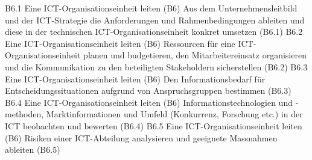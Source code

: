 \templateCard
  {B6.1}
  {Eine ICT-Organisationseinheit leiten (B6)}
  {Aus dem Unternehmensleitbild und der ICT-Strategie die Anforderungen und Rahmenbedingungen ableiten und diese in der technischen ICT-Organisationseinheit konkret umsetzen (B6.1)}
\templateCard
  {B6.2}
  {Eine ICT-Organisationseinheit leiten (B6)}
  {Ressourcen für eine ICT-Organisationseinheit planen und budgetieren, den Mitarbeitereinsatz organisieren und die Kommunikation zu den beteiligten Stakeholdern sicherstellen (B6.2)}
\templateCard
  {B6.3}
  {Eine ICT-Organisationseinheit leiten (B6)}
  {Den Informationsbedarf für Entscheidungssituationen aufgrund von Anspruchsgruppen bestimmen (B6.3)}
\templateCard
  {B6.4}
  {Eine ICT-Organisationseinheit leiten (B6)}
  {Informationstechnologien und -methoden, Marktinformationen und Umfeld (Konkurrenz, Forschung etc.) in der ICT beobachten und bewerten (B6.4)}
\templateCard
  {B6.5}
  {Eine ICT-Organisationseinheit leiten (B6)}
  {Risiken einer ICT-Abteilung analysieren und geeignete Massnahmen ableiten (B6.5)}
